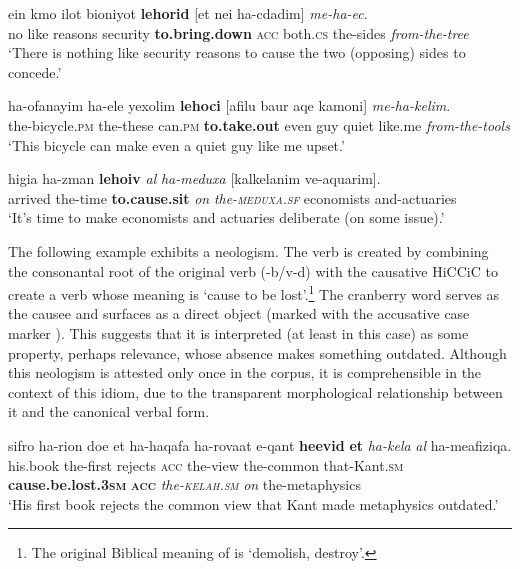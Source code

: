 \documentclass[output=paper]{langsci/langscibook}
\begin{document}
    \ea\label{she:ec-cause}
        \gll {\alef}ein kmo {\ayin}ilot bi{\tet}{\het}oniyot \textbf{lehorid} \textnormal{[}{\alef}et {\shin}nei ha-cdadim\textnormal{]} \textit{me-ha-{\ayin}ec}.\\
            no like reasons security \textbf{to.bring.down} \spacebr{}\textsc{acc} both.\textsc{cs} the-sides \textit{from-the-tree}\\
        \glt `There is nothing like security reasons to cause the two (opposing) sides to concede.'\\
    \z

	\ea\label{she:yaca-cause}
    	\gll ha-{\alef}ofanayim ha-{\alef}ele yexolim \textbf{lehoci} \textnormal{[}{\alef}afilu ba{\het}ur {\shin}aqe{\tet} kamoni\textnormal{]} \textit{me-ha-kelim}.\\
    	   the-bicycle.\textsc{pm} the-these can.\textsc{pm} \textbf{to.take.out} \spacebr{}even guy quiet like.me \textit{from-the-tools}\\
    	\glt `This bicycle can make even a quiet guy like me upset.'
	\z

    \ea\label{she:meduxa-cause}
        \gll higi{\ayin}a ha-zman \textbf{leho{\shinB}iv} \textit{{\ayin}al} \textit{ha-meduxa} \textnormal{[}kalkelanim ve-aq{\tet}u{\alef}arim\textnormal{]}.\\
            arrived the-time \textbf{to.cause.sit} \textit{on} \textit{the-\textsc{meduxa}.\textsc{sf}} \spacebr{}economists and-actuaries\\
        \glt `It's time to make economists and actuaries deliberate (on some issue).'
    \z

The following example exhibits a neologism. The verb  is created by combining the consonantal root of the original verb  ({\alef}-b/v-d) with the causative  HiCCiC to create a verb whose meaning is `cause to be lost'.\footnote{The original Biblical meaning of  is `demolish, destroy'.} The cranberry word  serves as the causee and surfaces as a direct object (marked with the accusative case marker ). This suggests that it is interpreted (at least in this case) as some property, perhaps relevance, whose absence makes something outdated. Although this neologism is attested only once in the corpus, it is comprehensible in the context of this idiom, due to the transparent morphological relationship between it and the canonical verbal form.

    \ea\label{she:kelax-cause}
        \gll sifro ha-ri{\shin}on do{\het}e {\alef}et ha-ha{\shin}qafa ha-rova{\het}at {\shin}e-qant \textbf{he{\alefB}evid} \textbf{{\alefB}et} \textit{ha-kela{\het}} \textit{{\ayin}al} ha-me{\tet}afiziqa.\\
            his.book the-first rejects \textsc{acc} the-view the-common that-Kant.\textsc{sm} \textbf{cause.be.lost.\textsc{3sm}} \textbf{\textsc{acc}} \textit{the-\textsc{kelah}.\textsc{sm}} \textit{on} the-metaphysics\\
        \glt `His first book rejects the common view that Kant made metaphysics outdated.'
    \z
\end{document}
